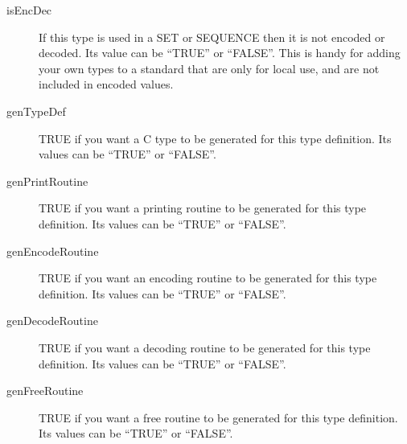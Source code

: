 \begin{description}
\item[isEncDec] {If this type is used in a SET or SEQUENCE then it is not
encoded or decoded.  Its value can be ``TRUE'' or ``FALSE''.  This is
handy for adding your own types to a standard that are only for local
use, and are not included in encoded values.}

\item[genTypeDef] { TRUE if you want a C type to be generated for this
type definition. Its values can be ``TRUE'' or ``FALSE''.}

\item[genPrintRoutine] { TRUE if you want a printing routine to be
generated for this type definition. Its values can be ``TRUE'' or
``FALSE''.}
\item[genEncodeRoutine] { TRUE if you want an encoding routine to be
generated for this type definition. Its values can be ``TRUE'' or
``FALSE''.}
\item[genDecodeRoutine] { TRUE if you want a decoding routine to be
generated for this type definition. Its values can be ``TRUE'' or
``FALSE''.}
\item[genFreeRoutine] { TRUE if you want a free routine to be
generated for this type definition. Its values can be ``TRUE'' or
``FALSE''.}
\end{description}


